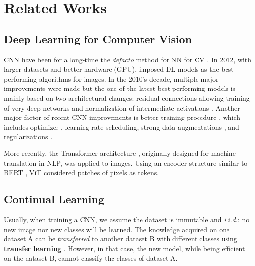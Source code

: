 \chapter{Related Works}
\label{chapter:related}

{}


\section{Deep Learning for Computer Vision}

\ac{CNN} have been for a long-time the \textit{defacto} method for \acs{NN} for \ac{CV}
\citep{fukushima1980neocognitron,lecun1999lenet}. In 2012, with larger datasets and better hardware
(\ie \acs{GPU}), \cite{krizhevsky2012alexnet} imposed \ac{DL} models as the best performing
algorithms for images. In the 2010's decade, multiple major improvements were made but the one of
the latest best performing models \citep{tan2019efficientnet} is mainly based on two architectural changes:
residual connections allowing training of very deep networks \citep{he2016resnet} and normalization
of intermediate activations \citep{ioffe2015batchnorm}. Another major factor of recent \ac{CNN}
improvements is better training procedure \citep{wightman2019resnetstrikesback}, which includes
optimizer \citep{kingma2014adam}, learning rate scheduling, strong data augmentations
\citep{muller2021trivialaugment,hingyi2018mixup,zhong2017erasing}, and regularizations
\citep{gal2016dropout,gao2016stochasticdepth}.

More recently, the Transformer architecture \citep{vaswani2017transformer}, originally designed for
machine translation in \ac{NLP}, was applied to images. Using an encoder structure similar to BERT
\citep{devlin2018bert}, ViT \citep{dosovitskiy2020vit} considered patches of pixels as tokens.

\section{Continual Learning}
\label{sec:related_continual}

Usually, when training a \ac{CNN}, we assume the dataset is immutable and \textit{i.i.d.}: no new
image nor new classes will be learned. The knowledge acquired on one dataset A can be
\textit{transferred} to another dataset B with different classes using \textbf{transfer learning}
\citep{razavian2014transferlearning}. However, in that case, the new model, while being efficient on
the dataset B, cannot classify the classes of dataset A.

